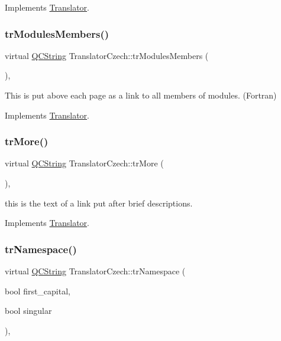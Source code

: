 Implements \mbox{\hyperlink{class_translator}{Translator}}.

\mbox{\label{class_translator_czech_a5013233cc16ce172e2196194b1dfb3eb}} 
\subsubsection{\texorpdfstring{trModulesMembers()}{trModulesMembers()}}
{\footnotesize\ttfamily virtual \mbox{\hyperlink{class_q_c_string}{Q\+C\+String}} Translator\+Czech\+::tr\+Modules\+Members (\begin{DoxyParamCaption}{ }\end{DoxyParamCaption})\hspace{0.3cm}{\ttfamily [inline]}, {\ttfamily [virtual]}}

This is put above each page as a link to all members of modules. (Fortran) 

Implements \mbox{\hyperlink{class_translator}{Translator}}.

\mbox{\label{class_translator_czech_af60ca3006749ce45b9c6a6a099345e90}} 
\subsubsection{\texorpdfstring{trMore()}{trMore()}}
{\footnotesize\ttfamily virtual \mbox{\hyperlink{class_q_c_string}{Q\+C\+String}} Translator\+Czech\+::tr\+More (\begin{DoxyParamCaption}{ }\end{DoxyParamCaption})\hspace{0.3cm}{\ttfamily [inline]}, {\ttfamily [virtual]}}

this is the text of a link put after brief descriptions. 

Implements \mbox{\hyperlink{class_translator}{Translator}}.

\mbox{\label{class_translator_czech_a578cf2ce23f8343b797eb6541b401d3f}} 
\subsubsection{\texorpdfstring{trNamespace()}{trNamespace()}}
{\footnotesize\ttfamily virtual \mbox{\hyperlink{class_q_c_string}{Q\+C\+String}} Translator\+Czech\+::tr\+Namespace (\begin{DoxyParamCaption}\item[{bool}]{first\+\_\+capital,  }\item[{bool}]{singular }\end{DoxyParamCaption})\hspace{0.3cm}{\ttfamily [inline]}, {\ttfamily [virtual]}}

